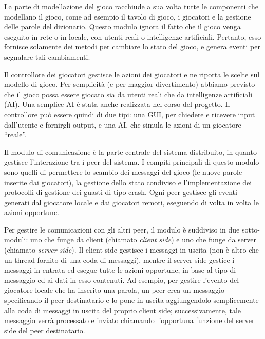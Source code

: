 \documentclass[10.5pt]{article}
\begin{document}
La parte di modellazione del gioco racchiude a sua volta tutte le componenti che modellano il gioco, come ad esempio il tavolo di gioco, i giocatori e la gestione delle parole del dizionario.
Questo modulo ignora il fatto che il gioco venga eseguito in rete o in locale, con utenti reali o intelligenze artificiali.
Pertanto, esso fornisce solamente dei metodi per cambiare lo stato del gioco, e genera eventi per segnalare tali cambiamenti.

Il controllore dei giocatori gestisce le azioni dei giocatori e ne riporta le scelte sul modello di gioco. Per semplicità (e per maggior divertimento) abbiamo previsto che il gioco possa essere giocato sia da utenti reali che da intelligenze artificiali (AI). Una semplice AI è stata anche realizzata nel corso del progetto. Il controllore può essere quindi di due tipi: una GUI, per chiedere e ricevere input dall'utente e fornirgli output, e una AI, che simula le azioni di un giocatore ``reale''.

Il modulo di comunicazione è la parte centrale del sistema distribuito, in quanto gestisce l'interazione tra i peer del sistema. I compiti principali di questo modulo sono quelli di permettere lo scambio dei messaggi del gioco (le nuove parole inserite dai giocatori), la gestione dello stato condiviso e l'implementazione dei protocolli di gestione dei guasti di tipo crash.
Ogni peer gestisce gli eventi generati dal giocatore locale e dai giocatori remoti, eseguendo di volta in volta le azioni opportune.

Per gestire le comunicazioni con gli altri peer, il modulo è suddiviso in due sotto-moduli: uno che funge da client (chiamato \emph{client side}) e uno che funge da server (chiamato \emph{server side}). Il client side gestisce i messaggi in uscita (non è altro che un thread fornito di una coda di messaggi), mentre il server side gestice i messaggi in entrata ed esegue tutte le azioni opportune, in base al tipo di messaggio ed ai dati in esso contenuti. 
Ad esempio, per gestire l'evento del giocatore locale che ha inserito una parola, un peer crea un messaggio specificando il peer destinatario e lo pone in uscita aggiungendolo semplicemente alla coda di messaggi in uscita del proprio client side; successivamente, tale messaggio verrà processato e inviato chiamando l'opportuna funzione del server side del peer destinatario.
\end{document}
